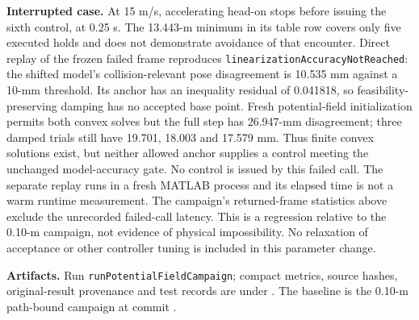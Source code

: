 \documentclass[10pt]{article}
\begin{document}
\textbf{Interrupted case.} At 15 m/s, accelerating head-on stops before
issuing the sixth control, at 0.25 s. The 13.443-m minimum in its table row
covers only five executed holds and does not demonstrate avoidance of that
encounter. Direct replay of the frozen failed frame reproduces
\texttt{linearizationAccuracyNotReached}: the shifted model's collision-relevant
pose disagreement is 10.535 mm against a 10-mm threshold. Its anchor has an
inequality residual of 0.041818, so feasibility-preserving damping has no
accepted base point. Fresh potential-field initialization permits both convex
solves but the full step has 26.947-mm disagreement; three damped trials still
have 19.701, 18.003 and 17.579 mm. Thus finite convex solutions exist, but neither
allowed anchor supplies a control meeting the unchanged model-accuracy gate.
No control is issued by this failed call. The separate replay runs in a fresh
MATLAB process and its elapsed time is not a warm runtime measurement. The
campaign's returned-frame statistics above exclude the unrecorded failed-call
latency. This is a regression relative to the 0.10-m campaign, not evidence of
physical impossibility. No relaxation of acceptance or other controller tuning
is included in this parameter change.

\textbf{Artifacts.} Run \texttt{runPotentialFieldCampaign}; compact metrics,
source hashes, original-result provenance and test records are under
. The baseline is the 0.10-m path-bound campaign
at commit .
\end{document}
